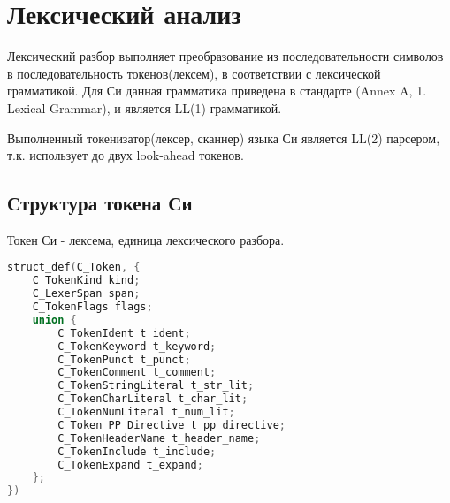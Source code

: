 

\clearpage
\section{Лексический анализ}
\label{pass:lexing}

Лексический разбор выполняет преобразование из последовательности символов в последовательность токенов(лексем), в соответствии с лексической грамматикой.
Для Си данная грамматика приведена в стандарте\cite{c99_std} (Annex A, 1. Lexical Grammar), и является LL(1) грамматикой.

Выполненный токенизатор(лексер, сканнер) языка Си является LL(2) парсером, т.к. использует до двух look-ahead токенов.

\subsection{Структура токена Си}

Токен Си - лексема, единица лексического разбора.

\begin{lstlisting}[language=c, caption={Структура токена Си}, label={lexing:c-token-struct}]
struct_def(C_Token, {
    C_TokenKind kind;
    C_LexerSpan span;
    C_TokenFlags flags;
    union {
        C_TokenIdent t_ident;
        C_TokenKeyword t_keyword;
        C_TokenPunct t_punct;
        C_TokenComment t_comment;
        C_TokenStringLiteral t_str_lit;
        C_TokenCharLiteral t_char_lit;
        C_TokenNumLiteral t_num_lit;
        C_Token_PP_Directive t_pp_directive;
        C_TokenHeaderName t_header_name;
        C_TokenInclude t_include;
        C_TokenExpand t_expand;
    };
})
\end{lstlisting}

